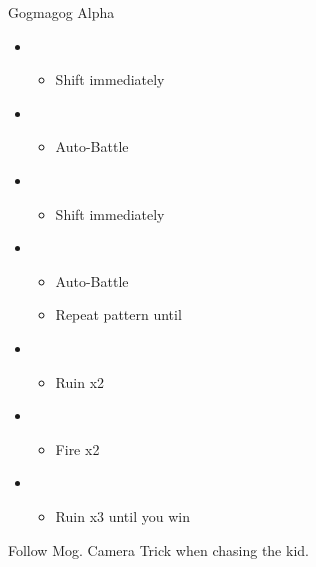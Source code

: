 
\begin{battle}{Gogmagog Alpha}
	\begin{itemize}
		\item \first
		      \begin{itemize}
			      \item Shift immediately
		      \end{itemize}
		\item \second
		      \begin{itemize}
			      \item Auto-Battle \comb
		      \end{itemize}
		\item \first
		      \begin{itemize}
			      \item Shift immediately
		      \end{itemize}
		\item \second
		      \begin{itemize}
			      \item Auto-Battle \comb
			      \item Repeat pattern until \stagger
		      \end{itemize}
		\item \first
		      \begin{itemize}
			      \item Ruin x2
		      \end{itemize}
		\item \second
		      \begin{itemize}
			      \item Fire x2
		      \end{itemize}
		\item \first
		      \begin{itemize}
			      \item Ruin x3 until you win
		      \end{itemize}
	\end{itemize}
\end{battle}


Follow Mog. Camera Trick when chasing the kid. 


